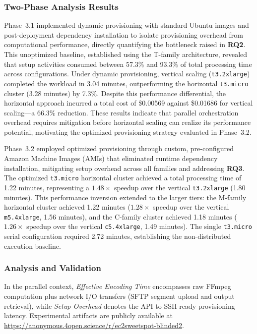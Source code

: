 \documentclass[conference]{IEEEtran}
\begin{document}
\subsubsection{Two-Phase Analysis Results}

Phase~3.1 implemented dynamic provisioning with standard Ubuntu images and
post-deployment dependency installation to isolate provisioning overhead from
computational performance, directly quantifying the bottleneck raised in \textbf{RQ2}. This unoptimized baseline, established using the
T-family architecture, revealed that setup activities consumed between 57.3\%
and 93.3\% of total processing time across configurations. Under dynamic
provisioning, vertical scaling (\texttt{t3.2xlarge}) completed the workload in
3.04 minutes, outperforming the horizontal \texttt{t3.micro} cluster (3.28
minutes) by 7.3\%. Despite this performance differential, the horizontal
approach incurred a total cost of \$0.00569 against \$0.01686 for vertical
scaling---a 66.3\% reduction. These results indicate that parallel
orchestration overhead requires mitigation before horizontal scaling can
realize its performance potential, motivating the optimized provisioning
strategy evaluated in Phase~3.2.

Phase~3.2 employed optimized provisioning through custom, pre-configured
Amazon Machine Images (AMIs) that eliminated runtime dependency installation,
mitigating setup overhead across all families and addressing \textbf{RQ3}. The optimized \texttt{t3.micro}
horizontal cluster achieved a total processing time of 1.22 minutes,
representing a $1.48\times$ speedup over the vertical \texttt{t3.2xlarge}
(1.80 minutes). This performance inversion extended to the larger tiers: the
M-family horizontal cluster achieved 1.22 minutes ($1.28\times$ speedup over
the vertical \texttt{m5.4xlarge}, 1.56 minutes), and the C-family cluster
achieved 1.18 minutes ($1.26\times$ speedup over the vertical
\texttt{c5.4xlarge}, 1.49 minutes). The single \texttt{t3.micro} serial
configuration required 2.72 minutes, establishing the non-distributed execution
baseline.

\subsubsection{Analysis and Validation}

In the parallel context, \textit{Effective Encoding Time} encompasses raw FFmpeg
computation plus network I/O transfers (SFTP segment upload and output retrieval),
while \textit{Setup Overhead} denotes the API-to-SSH-ready provisioning latency.
Experimental artifacts are publicly available at \url{https://anonymous.4open.science/r/ec2sweetspot-blinded2}.
\end{document}

